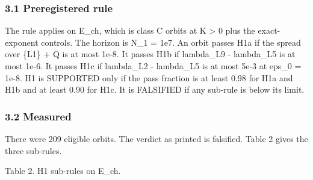 \documentclass[
  11pt,
]{article}
\begin{document}
\subsubsection{3.1 Preregistered rule}\label{preregistered-rule}

The rule applies on E\_ch, which is class C orbits at K \textgreater{} 0
plus the exact-exponent controls. The horizon is N\_1 = 1e7. An orbit
passes H1a if the spread over \{L1\} + Q is at most 1e-8. It passes H1b
if \textbar lambda\_L9 - lambda\_L5\textbar{} is at most 1e-6. It passes
H1c if \textbar lambda\_L2 - lambda\_L5\textbar{} is at most 5e-3 at
eps\_0 = 1e-8. H1 is SUPPORTED only if the pass fraction is at least
0.98 for H1a and H1b and at least 0.90 for H1c. It is FALSIFIED if any
sub-rule is below its limit.

\subsubsection{3.2 Measured}\label{measured}

There were 209 eligible orbits. The verdict as printed is falsified.
Table 2 gives the three sub-rules.

Table 2. H1 sub-rules on E\_ch.
\end{document}

